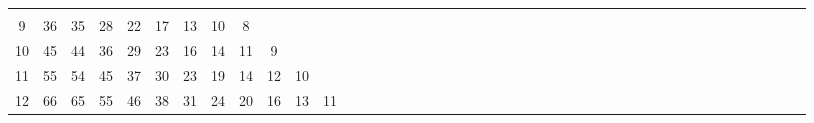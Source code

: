 \documentclass[12pt,a4paper]{amsart}
\theoremstyle{definition} %
\theoremstyle{plain} %
\begin{document}
\begin{table}[h]
{\begin{tabular}{|c|*{44}{c|}}
                          &             &             &             &             &             &             &             &             &             &             &             &             &             &             &             &             &             &             &             &             &             &             &             &             &             &             &             &             &             \\
                 9 &         36 &         35 &         28 &         22 &         17 &         13 &         10 &          8 &            &             &             &             &             &             &   
                          &             &             &             &             &             &             &             &             &             &             &             &             &             &             &             &             &             &             &             &             &             &             &             &             &             &             &             &             &             \\
                10 &         45 &         44 &         36 &         29 &         23 &         16 &         14 &         11 &          9 &             &             &             &             &             &   
                         &             &             &             &             &             &             &             &             &             &             &             &             &             &             &             &             &             &             &             &             &             &             &             &             &             &             &             &             &             \\
                11 &         55 &         54 &         45 &         37 &         30 &         23 &         19 &         14 &         12 &          10 &             &             &             &             &   
                         &             &             &             &             &             &             &             &             &             &             &             &             &             &             &             &             &             &             &             &             &             &             &             &             &             &             &             &             &             \\
                12 &         66 &         65 &         55 &         46 &         38 &         31 &         24 &         20 &         16 &          13 &          11 &             &             &             &   

\end{tabular}}
\end{table}
\end{document}
